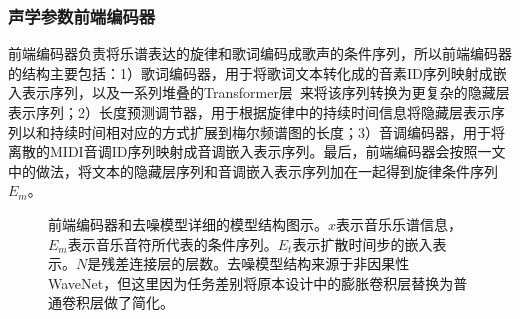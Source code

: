 \subsubsection{声学参数前端编码器}
前端编码器负责将乐谱表达的旋律和歌词编码成歌声的条件序列，所以前端编码器的结构主要包括：1）歌词编码器，用于将歌词文本转化成的音素ID序列映射成嵌入表示序列，以及一系列堆叠的Transformer层~\citep{vaswani2017attention}来将该序列转换为更复杂的隐藏层表示序列；2）长度预测调节器，用于根据旋律中的持续时间信息将隐藏层表示序列以和持续时间相对应的方式扩展到梅尔频谱图的长度；3）音调编码器，用于将离散的MIDI音调ID序列映射成音调嵌入表示序列。最后，前端编码器会按照\citet{ren2020deepsinger}一文中的做法，将文本的隐藏层序列和音调嵌入表示序列加在一起得到旋律条件序列$E_m$。
\begin{figure}[!h]
    \centering
    \caption{前端编码器和去噪模型详细的模型结构图示。$x$表示音乐乐谱信息，$E_m$表示音乐音符所代表的条件序列。$E_t$表示扩散时间步的嵌入表示。$N$是残差连接层的层数。去噪模型结构来源于非因果性WaveNet\citep{vanwavenet}，但这里因为任务差别将原本设计中的膨胀卷积层替换为普通卷积层做了简化。}
    \label{supfig:encoder_auxdecoder}
\end{figure}
